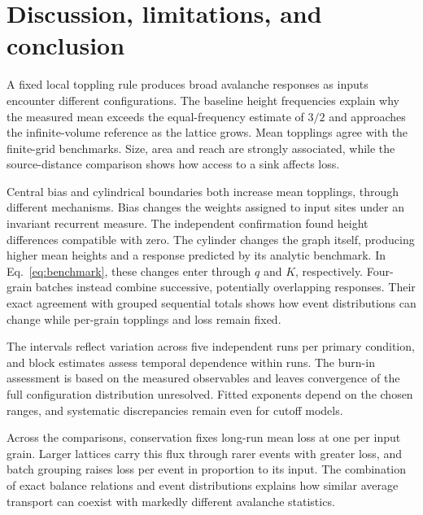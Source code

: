 \chapter{Discussion, limitations, and conclusion}\label{sec:conclusion}
A fixed local toppling rule produces broad avalanche responses as inputs encounter different configurations. The baseline height frequencies explain why the measured mean exceeds the equal-frequency estimate of $3/2$ and approaches the infinite-volume reference as the lattice grows. Mean topplings agree with the finite-grid benchmarks. Size, area and reach are strongly associated, while the source-distance comparison shows how access to a sink affects loss.

Central bias and cylindrical boundaries both increase mean topplings, through different mechanisms. Bias changes the weights assigned to input sites under an invariant recurrent measure. The independent confirmation found height differences compatible with zero. The cylinder changes the graph itself, producing higher mean heights and a response predicted by its analytic benchmark. In Eq.~\eqref{eq:benchmark}, these changes enter through $q$ and $K$, respectively. Four-grain batches instead combine successive, potentially overlapping responses. Their exact agreement with grouped sequential totals shows how event distributions can change while per-grain topplings and loss remain fixed.

The intervals reflect variation across five independent runs per primary condition, and block estimates assess temporal dependence within runs. The burn-in assessment is based on the measured observables and leaves convergence of the full configuration distribution unresolved. Fitted exponents depend on the chosen ranges, and systematic discrepancies remain even for cutoff models.

Across the comparisons, conservation fixes long-run mean loss at one per input grain. Larger lattices carry this flux through rarer events with greater loss, and batch grouping raises loss per event in proportion to its input. The combination of exact balance relations and event distributions explains how similar average transport can coexist with markedly different avalanche statistics.
